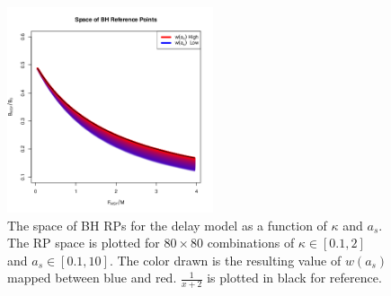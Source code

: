 %
\begin{figure} %
\vspace{-2.75cm}
\includegraphics[width=0.54\textwidth]{../ddBias/rpSpaceww.png}
\vspace{-1.5cm}
\caption{
The space of BH RPs for the delay model as a function of $\kappa$ and $a_s$.
The RP space is plotted for $80\times80$ combinations of $\kappa\in[0.1, 2]$
and $a_s\in[0.1, 10]$. The color drawn is the resulting value of $w(a_s)$
mapped between blue and red.
$\frac{1}{x+2}$ is plotted in black for reference.
%
}
\label{rpSpace}
\end{figure}

